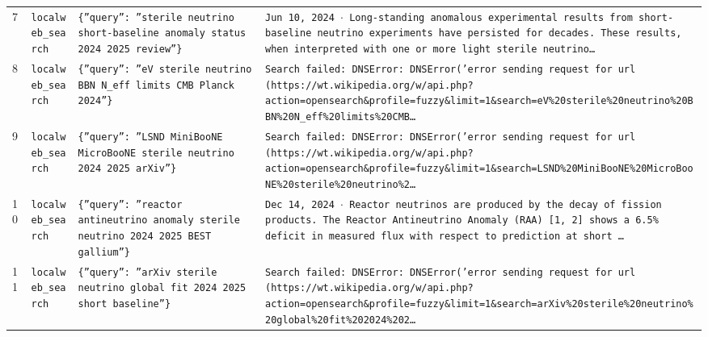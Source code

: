 \documentclass[11pt,a4paper]{article}
\begin{document}
\begin{longtable}{@{}p{}p{}p{}p{}@{}}
7 & \texttt{local}\newline\texttt{web\_\allowbreak{}search} & \texttt{\{''query'':\allowbreak{} ''sterile neutrino short-baseline anomaly status 2024 2025 review''\}\allowbreak{}} & \texttt{Jun 10,\allowbreak{} 2024 $\cdot$ Long-standing anomalous experimental results from short-baseline neutrino experiments have persisted for decades. These results,\allowbreak{} when interpreted with one or more light sterile neutrino\ldots{}\allowbreak{}} \\
8 & \texttt{local}\newline\texttt{web\_\allowbreak{}search} & \texttt{\{''query'':\allowbreak{} ''eV sterile neutrino BBN N\_\allowbreak{}eff limits CMB Planck 2024''\}\allowbreak{}} & \texttt{Search failed:\allowbreak{} DNSError:\allowbreak{} DNSError('error sending request for url (https:\allowbreak{}/\allowbreak{}/\allowbreak{}wt.wikipedia.org/\allowbreak{}w/\allowbreak{}api.php?action=\allowbreak{}opensearch\&profile=\allowbreak{}fuzzy\&limit=\allowbreak{}1\&search=\allowbreak{}eV\%20sterile\%20neutrino\%20BBN\%20N\_\allowbreak{}eff\%20limits\%20CMB\ldots{}\allowbreak{}} \\
9 & \texttt{local}\newline\texttt{web\_\allowbreak{}search} & \texttt{\{''query'':\allowbreak{} ''LSND MiniBooNE MicroBooNE sterile neutrino 2024 2025 arXiv''\}\allowbreak{}} & \texttt{Search failed:\allowbreak{} DNSError:\allowbreak{} DNSError('error sending request for url (https:\allowbreak{}/\allowbreak{}/\allowbreak{}wt.wikipedia.org/\allowbreak{}w/\allowbreak{}api.php?action=\allowbreak{}opensearch\&profile=\allowbreak{}fuzzy\&limit=\allowbreak{}1\&search=\allowbreak{}LSND\%20MiniBooNE\%20MicroBooNE\%20sterile\%20neutrino\%2\ldots{}\allowbreak{}} \\
10 & \texttt{local}\newline\texttt{web\_\allowbreak{}search} & \texttt{\{''query'':\allowbreak{} ''reactor antineutrino anomaly sterile neutrino 2024 2025 BEST gallium''\}\allowbreak{}} & \texttt{Dec 14,\allowbreak{} 2024 $\cdot$ Reactor neutrinos are produced by the decay of fission products. The Reactor Antineutrino Anomaly (RAA)\allowbreak{} [1,\allowbreak{} 2]\allowbreak{} shows a 6.5\% deficit in measured flux with respect to prediction at short \ldots{}\allowbreak{}} \\
11 & \texttt{local}\newline\texttt{web\_\allowbreak{}search} & \texttt{\{''query'':\allowbreak{} ''arXiv sterile neutrino global fit 2024 2025 short baseline''\}\allowbreak{}} & \texttt{Search failed:\allowbreak{} DNSError:\allowbreak{} DNSError('error sending request for url (https:\allowbreak{}/\allowbreak{}/\allowbreak{}wt.wikipedia.org/\allowbreak{}w/\allowbreak{}api.php?action=\allowbreak{}opensearch\&profile=\allowbreak{}fuzzy\&limit=\allowbreak{}1\&search=\allowbreak{}arXiv\%20sterile\%20neutrino\%20global\%20fit\%202024\%202\ldots{}\allowbreak{}} \\

\end{longtable}
\end{document}
